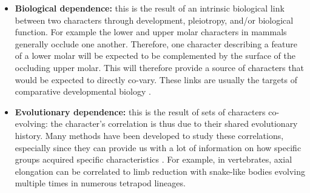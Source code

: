 \documentclass[12pt,letterpaper]{article}
\begin{document}
\begin{itemize}

    \item \textbf{Biological dependence:} this is the result of an intrinsic biological link between two characters through development, pleiotropy, and/or biological function.
    For example the lower and upper molar characters in mammals generally occlude one another. 
    Therefore, one character describing a feature of a lower molar will be expected to be complemented by the surface of the occluding upper molar.
    This will therefore provide a source of characters that would be expected to directly co-vary.
    These links are usually the targets of comparative developmental biology \citep{goswami2006morphological,goswami2010,goswami2014macroevolutionary}.

    \item \textbf{Evolutionary dependence:} this is the result of sets of characters co-evolving: the character's correlation is thus due to their shared evolutionary history.
    Many methods have been developed to study these correlations, especially since they can provide us with a lot of information on how specific groups acquired specific characteristics \citep{Lande1983,Maddison1990,Pagel1994,Pagel2006,Grabowski2016}.
    For example, in vertebrates, axial elongation can be correlated to limb reduction with snake-like bodies evolving multiple times in numerous tetrapod lineages.


\end{itemize}
\end{document}
